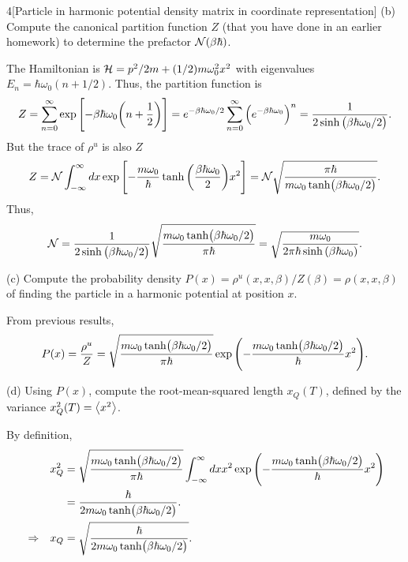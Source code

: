 \documentclass[12pt]{article}
\begin{document}
\begin{problem}{4}[Particle in harmonic potential density matrix in coordinate
    representation]
(b) Compute the canonical partition function $Z$ (that you have done in an
earlier homework) to determine the prefactor $\mathcal{N}(\beta\hbar)$.
\begin{solution}
The Hamiltonian is $\mathcal{H}=p^2/2m+(1/2)m\omega_0^2x^2$ with eigenvalues
$E_n=\hbar\omega_0(n+1/2)$. Thus, the partition function is
\begin{align}
    Z=\sum_{n=0}^\infty\exp\qty[-\beta\hbar\omega_0\qty(n+\frac12)]
    =e^{-\beta\hbar\omega_0/2}\sum_{n=0}^\infty\qty(e^{-\beta\hbar\omega_0})^n
    =\frac1{2\sinh\qty(\beta\hbar\omega_0/2)}.
\end{align}
But the trace of $\rho^u$ is also $Z$
\begin{align}
    Z=\mathcal{N}\int_{-\infty}^\infty dx
    \exp\qty[-\frac{m\omega_0}{\hbar}\tanh\qty(\frac{\beta\hbar\omega_0}{2})x^2]
    =\mathcal{N}\sqrt{\frac{\pi\hbar}{m\omega_0\tanh(\beta\hbar\omega_0/2)}}.
\end{align}
Thus,
\begin{equation}
    \mathcal{N}=\frac1{2\sinh\qty(\beta\hbar\omega_0/2)}\sqrt{\frac{m\omega_0\tanh(\beta\hbar\omega_0/2)}{\pi\hbar}}
    =\sqrt{\frac{m\omega_0}{2\pi\hbar\sinh\qty(\beta\hbar\omega_0)}}.
\end{equation}
\end{solution}

(c) Compute the probability density
$P(x)=\rho^u(x,x,\beta)/Z(\beta)=\rho(x,x,\beta)$ of finding the particle in a
harmonic potential at position $x$.
\begin{solution}
From previous results,
\begin{align}
    P(x)=\frac{\rho^u}{Z}
    =\sqrt{\frac{m\omega_0\tanh(\beta\hbar\omega_0/2)}{\pi\hbar}}\exp
    \qty(-\frac{m\omega_0\tanh(\beta\hbar\omega_0/2)}{\hbar}x^2).
\end{align}
\end{solution}

(d) Using $P(x)$, compute the root-mean-squared length $x_Q(T)$, defined by the
variance $x_Q^2(T)=\expval{x^2}$.
\begin{solution}
By definition,
\begin{align}
    &&x_Q^2
    &=\sqrt{\frac{m\omega_0\tanh(\beta\hbar\omega_0/2)}{\pi\hbar}}
    \int_{-\infty}^\infty dx
    x^2\exp\qty(-\frac{m\omega_0\tanh(\beta\hbar\omega_0/2)}{\hbar}x^2)\notag\\
    &&&=\frac{\hbar}{2m\omega_0\tanh(\beta\hbar\omega_0/2)}.\notag\\
    &\Rightarrow&
    x_Q&=\sqrt{\frac{\hbar}{2m\omega_0\tanh(\beta\hbar\omega_0/2)}}.
\end{align}
\end{solution}


\end{problem}
\end{document}
